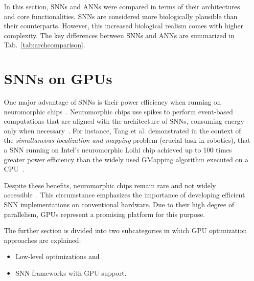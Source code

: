 In this section, \acp{SNN} and \acp{ANN} were compared in terms of their architectures and core functionalities.  
\acp{SNN} are considered more biologically plausible than their counterparts.  
However, this increased biological realism comes with higher complexity.  
The key differences between \acp{SNN} and \acp{ANN} are summarized in Tab.~\ref{tab:archcomparison}.

\section{\acp{SNN} on \acp{GPU}} \label{Sec:SNNsOnGPUs}
One major advantage of \acp{SNN} is their power efficiency when running on neuromorphic chips~\cite{tavanaei_deep_2019, qu_high_2020, pietrzak_overview_2023}.  
Neuromorphic chips use spikes to perform event-based computations that are aligned with the architecture of \acp{SNN}, consuming energy only when necessary~\cite{esser_backpropagation_2015}.  
For instance, Tang et al. demonstrated in the context of the \textit{simultaneous localization and mapping} problem (crucial task in robotics), that a \ac{SNN} running on Intel's neuromorphic Loihi chip achieved up to 100 times greater power efficiency than the widely used GMapping algorithm executed on a \ac{CPU}~\cite{tang_spiking_2019}.  

Despite these benefits, neuromorphic chips remain rare and not widely accessible~\cite{qu_high_2020}.  
This circumstance emphasizes the importance of developing efficient \ac{SNN} implementations on conventional hardware.  
Due to their high degree of parallelism, \acp{GPU} represent a promising platform for this purpose.

The further section is divided into two subcategories in which \ac{GPU} optimization approaches are explained:
\begin{itemize}
    \item Low-level optimizations and
    \item \ac{SNN} frameworks with \ac{GPU} support.
\end{itemize}

